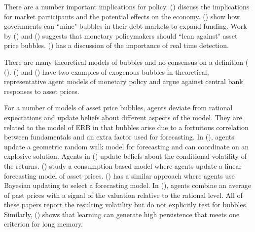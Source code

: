 \documentclass[12pt]{article}
\begin{document}
There are a number important implications for policy. \citeauthor{Boubaker2022CUSUM} (\citeyear{Boubaker2022CUSUM}) discuss the implications for market participants and the potential effects on the economy. \citeauthor{Brunnermeier_Merkel_Sannikov_2020bubFTPL} (\citeyear{Brunnermeier_Merkel_Sannikov_2020bubFTPL}) show how governments can ``mine" bubbles in their debt markets to expand funding. Work by \citeauthor{Cecchetti2000bubCB} (\citeyear{Cecchetti2000bubCB}) and \citeauthor{miao2019MPbub} (\citeyear{miao2019MPbub}) suggests that monetary policymakers should ``lean against" asset price bubbles. \citeauthor{phillips2015testing} (\citeyear{phillips2015testing}) has a discussion of the importance of real time detection. 

There are many theoretical models of bubbles and no consensus on a definition (\citeauthor{evanoff2012asset} (\citeyear{evanoff2012asset}). \citeauthor{bernankegertler1999MPassetvolatility} (\citeyear{bernankegertler1999MPassetvolatility}) and \citeauthor{allen2022assetboom} (\citeyear{allen2022assetboom}) have two examples of exogenous bubbles in theoretical, representative agent models of monetary policy and argue against central bank responses to asset prices. 

For a number of models of asset price bubbles, agents deviate from rational expectations and update beliefs about different aspects of the model. They are related to the model of ERB in that bubbles arise due to a fortuitous correlation between fundamentals and an extra factor used for forecasting. In \citeauthor{lansing2010rational} (\citeyear{lansing2010rational}), agents update a geometric random walk model for forecasting and can coordinate on an explosive solution. Agents in \citeauthor{branch2011learning} (\citeyear{branch2011learning}) update beliefs about the conditional volatility of the returns. \citeauthor{adam2016stock} (\citeyear{adam2016stock}) study a consumption based model where agents update a linear forecasting model of asset prices. \citeauthor{adametal2017stockboom} (\citeyear{adametal2017stockboom}) has a similar approach where agents use Bayesian updating to select a forecasting model. In \citeauthor{BarberisSchleiferetal2018ExtrapolationBub} (\citeyear{BarberisSchleiferetal2018ExtrapolationBub}), agents combine an average of past prices with a signal of the valuation relative to the rational level. All of these papers report the resulting volatility but do not explicitly test for bubbles. Similarly, \citeauthor{Chevillon2017longmemory} (\citeyear{Chevillon2017longmemory}) shows that learning can generate high persistence that meets one criterion for long memory.
\end{document}
